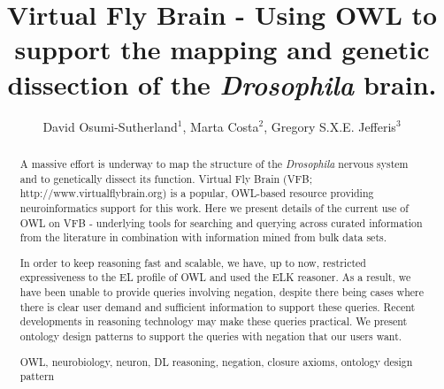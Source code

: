\documentclass[runningheads,a4paper]{llncs}
\newcommand{\keywords}[1]{\par\addvspace\baselineskip
\noindent\keywordname\enspace\ignorespaces#1}
\begin{document}
\mainmatter  %

\title{Virtual Fly Brain - Using OWL to support the mapping and
  genetic dissection of the \textit{Drosophila} brain.}


%
%
\author{David Osumi-Sutherland$^1$, Marta Costa$^2$, Gregory S.X.E. Jefferis$^3$}

%


%
%

\toctitle{}
\tocauthor{}
\maketitle


\begin{abstract}
A massive effort is underway to map the structure of the \textit{Drosophila}
nervous system and to genetically dissect its function. Virtual Fly
Brain (VFB; http://www.virtualflybrain.org) is a popular, OWL-based resource
providing neuroinformatics support for this work.  Here we present
details of the current use of OWL on VFB  - underlying tools for
searching and querying across curated information from the literature
in combination with information mined from bulk data sets.

In order to keep reasoning fast and scalable, we have, up to now, restricted
expressiveness to the EL profile of OWL and used the ELK reasoner. As a result,
we have been unable to provide queries involving negation, despite
there being cases where there is clear
user demand and sufficient information to support these
queries. Recent developments in reasoning technology may
make these queries practical. We present ontology design patterns to
support the queries with negation that our users want.

\keywords{OWL, neurobiology, neuron, DL reasoning, negation, closure
  axioms, ontology design pattern}
\end{abstract}
\end{document}
